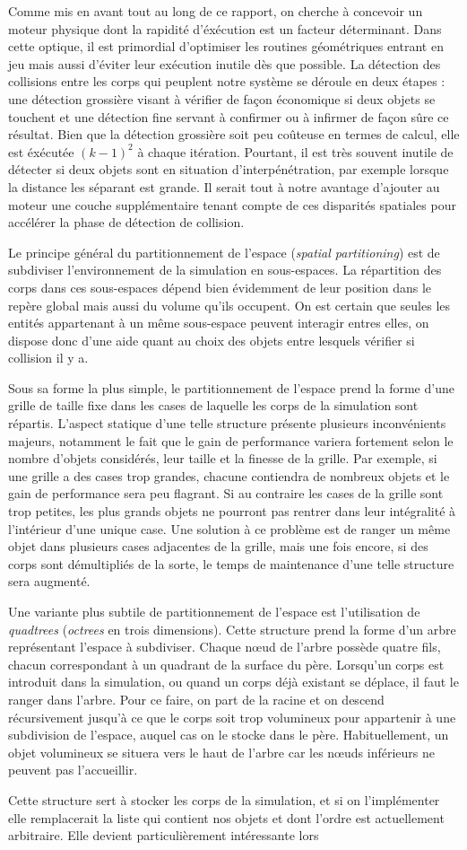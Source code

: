 Comme mis en avant tout au long de ce rapport, on cherche à concevoir
un moteur physique dont la rapidité d'éxécution est un facteur
déterminant. Dans cette optique, il est primordial d'optimiser les
routines géométriques entrant en jeu mais aussi d'éviter leur
exécution inutile dès que possible. La détection des collisions entre
les corps qui peuplent notre système se déroule en deux étapes : une
détection grossière visant à vérifier de façon économique si deux
objets se touchent et une détection fine servant à confirmer ou à
infirmer de façon sûre ce résultat. Bien que la détection grossière
soit peu coûteuse en termes de calcul, elle est éxécutée $(k-1)^2$ à
chaque itération. Pourtant, il est très souvent inutile de détecter si
deux objets sont en situation d'interpénétration, par exemple lorsque
la distance les séparant est grande. Il serait tout à notre avantage
d'ajouter au moteur une couche supplémentaire tenant compte de ces
disparités spatiales pour accélérer la phase de détection de
collision.

Le principe général du partitionnement de l'espace (\textit{spatial
  partitioning}) est de subdiviser l'environnement de la simulation en
sous-espaces. La répartition des corps dans ces sous-espaces dépend
bien évidemment de leur position dans le repère global mais aussi du
volume qu'ils occupent. On est certain que seules les entités
appartenant à un même sous-espace peuvent interagir entres elles, on
dispose donc d'une aide quant au choix des objets entre lesquels
vérifier si collision il y a.

Sous sa forme la plus simple, le partitionnement de l'espace prend la
forme d'une grille de taille fixe dans les cases de laquelle les corps
de la simulation sont répartis. L'aspect statique d'une telle
structure présente plusieurs inconvénients majeurs, notamment le fait
que le gain de performance variera fortement selon le nombre d'objets
considérés, leur taille et la finesse de la grille. Par exemple, si
une grille a des cases trop grandes, chacune contiendra de nombreux
objets et le gain de performance sera peu flagrant. Si au contraire
les cases de la grille sont trop petites, les plus grands objets ne
pourront pas rentrer dans leur intégralité à l'intérieur d'une unique
case. Une solution à ce problème est de ranger un même objet dans
plusieurs cases adjacentes de la grille, mais une fois encore, si des
corps sont démultipliés de la sorte, le temps de maintenance d'une
telle structure sera augmenté.

Une variante plus subtile de partitionnement de l'espace est
l'utilisation de \textit{quadtrees} (\textit{octrees} en trois
dimensions). Cette structure prend la forme d'un arbre représentant
l'espace à subdiviser. Chaque n\oe ud de l'arbre possède quatre fils,
chacun correspondant à un quadrant de la surface du père. Lorsqu'un
corps est introduit dans la simulation, ou quand un corps déjà
existant se déplace, il faut le ranger dans l'arbre. Pour ce faire, on
part de la racine et on descend récursivement jusqu'à ce que le corps
soit trop volumineux pour appartenir à une subdivision de l'espace,
auquel cas on le stocke dans le père. Habituellement, un objet
volumineux se situera vers le haut de l'arbre car les n\oe uds
inférieurs ne peuvent pas l'accueillir.

Cette structure sert à stocker les corps de la simulation, et si on
l'implémenter elle remplacerait la liste qui contient nos objets et
dont l'ordre est actuellement arbitraire. Elle devient
particulièrement intéressante lors
